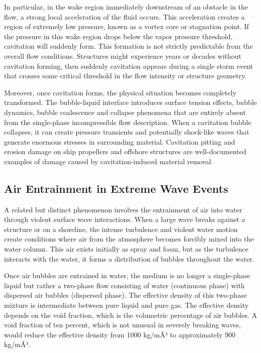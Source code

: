 ﻿\documentclass[a4paper,11pt]{article}
\theoremstyle{definition}
\begin{document}
In particular, in the wake region immediately downstream of an obstacle in the flow, a strong local acceleration of the fluid occurs. This acceleration creates a region of extremely low pressure, known as a vortex core or stagnation point. If the pressure in this wake region drops below the vapor pressure threshold, cavitation will suddenly form. This formation is not strictly predictable from the overall flow conditions. Structures might experience years or decades without cavitation forming, then suddenly cavitation appears during a single storm event that crosses some critical threshold in the flow intensity or structure geometry.

Moreover, once cavitation forms, the physical situation becomes completely transformed. The bubble-liquid interface introduces surface tension effects, bubble dynamics, bubble coalescence and collapse phenomena that are entirely absent from the single-phase incompressible flow description. When a cavitation bubble collapses, it can create pressure transients and potentially shock-like waves that generate enormous stresses in surrounding material. Cavitation pitting and erosion damage on ship propellers and offshore structures are well-documented examples of damage caused by cavitation-induced material removal.

\subsection{Air Entrainment in Extreme Wave Events}

A related but distinct phenomenon involves the entrainment of air into water through violent surface wave interactions. When a large wave breaks against a structure or on a shoreline, the intense turbulence and violent water motion create conditions where air from the atmosphere becomes forcibly mixed into the water column. This air exists initially as spray and foam, but as the turbulence interacts with the water, it forms a distribution of bubbles throughout the water.

Once air bubbles are entrained in water, the medium is no longer a single-phase liquid but rather a two-phase flow consisting of water (continuous phase) with dispersed air bubbles (dispersed phase). The effective density of this two-phase mixture is intermediate between pure liquid and pure gas. The effective density depends on the void fraction, which is the volumetric percentage of air bubbles. A void fraction of ten percent, which is not unusual in severely breaking waves, would reduce the effective density from 1000 kg/mÂ³ to approximately 900 kg/mÂ³.
\end{document}
